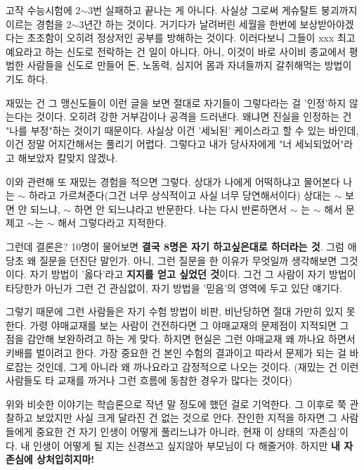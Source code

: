 고작 수능시험에 2$\sim$3번 실패하고 끝나는 게 아니다. 사실상 그로써 게슈탈트 붕괴까지 이르는 경험을 2$\sim$3년간 하는 것이다.
거기다가 날려버린 세월을 한번에 보상받아야겠다는 초조함이 오히려 정상저인 공부를 방해하는 것이다.
이러다보니 그들이 xxx 최고예요라고 하는 신도로 전락하는 건 일이 아니다.
아니, 이것이 바로 사이비 종교에서 평범한 사람들을 신도로 만들어 돈, 노동력, 심지어 몸과 자녀들까지 갈취해먹는 방법이기도 하다.
\vspace{5mm}

재밌는 건 그 맹신도들이 이런 글을 보면 절대로 자기들이 그렇다라는 걸 '인정'하지 않는다는 것이다.
오히려 강한 거부감이나 공격을 드러낸다. 왜냐면 진실을 인정하는 건 "나를 부정"하는 것이기 때문이다.
사실상 이건 '세뇌된' 케이스라고 할 수 있는 바인데, 이건 정말 어지간해서는 풀리기 어렵다.
그렇다고 내가 당사자에게 "너 세뇌되었어"라고 해보았자 칼맞지 않겠나.
\vspace{5mm}

이와 관련해 또 재밌는 경험을 적으면 그렇다.
상대가 나에게 어떡하냐고 물어본다
나는 $\sim$ 하라고 가르쳐준다(그건 너무 상식적이고 사실 너무 당연해서이다)
상대는 $\sim$ 보면 안 되느냐, $\sim$ 하면 안 되느냐라고 반문한다.
나는 다시 반론하면서 $\sim$ 는 $\sim$ 해서 문제고 $\sim$는 $\sim$ 해서 그렇다라고 지적한다.
\vspace{5mm}

그런데 결론은? 10명이 물어보면 \textbf{결국 8명은 자기 하고싶은대로 하더라는 것}.
그럼 애당초 왜 질문을 던진단 말인가.
아니, 그런 질문을 한 이유가 무엇일까 생각해보면 그것이다.
자기 방법이 '옳다'라고 \textbf{지지를 얻고 싶었던 것}이다.
그건 그 사람이 자기 방법이 타당한가 아닌가 그런 건 관심없이, 자기 방법을 '믿음'의 영역에 두고 있단 얘기다.
\vspace{5mm}

그렇기 때문에 그런 사람들은 자기 수험 방법이 비판, 비난당하면 절대 가만히 있지 못 한다.
가령 야매교재를 보는 사람이 건전하다면 그 야매교재의 문제점이 지적되면 그 점을 감안해 보완하려고 하는 게 맞다.
하지면 현실은 그런 야매교재 왜 까나요 하면서 키배를 벌이려고 한다.
가장 중요한 건 본인 수험의 결과이고 따라서 문제가 되는 걸 바로잡는 것인데, 그게 아니라 왜 까나요라고 감정적으로 나오는 것이다.
(재밌는 건 이런 사람들도 타 교재를 까거나 그런 흐름에 동참한 경우가 많다는 것이다)
\vspace{5mm}

위와 비슷한 이야기는 학습론으로 작년 말 정도에 했던 걸로 기억한다.
그 이후로 쭉 관찰하고 보았지만 사실 크게 달라진 건 없는 것으로 안다.
잔인한 지적을 하자면 그 사람들에게 중요한 건 자기 인생이 어떻게 풀리느냐가 아니라, 현재 이 상태의 '자존심'이다.
내 인생이 어떻게 될 지는 신경쓰고 싶지않아 부모님이 다 해줄거야. 하지만 \textbf{내 자존심에 상처입히지마!}
\vspace{5mm}






